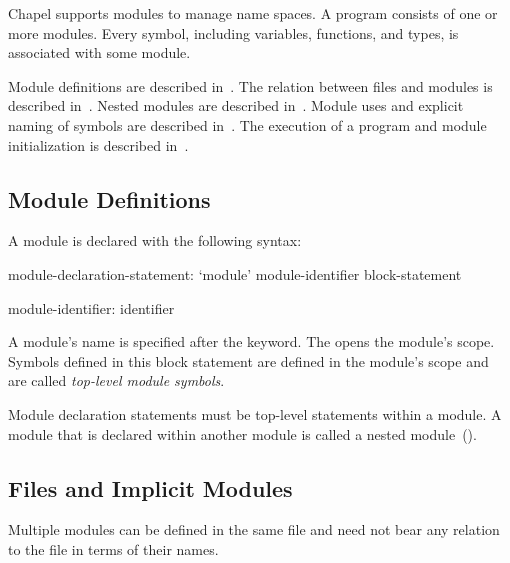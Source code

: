 \label{Modules}


Chapel supports modules to manage name spaces.  A program consists of
one or more modules.  Every symbol, including variables, functions,
and types, is associated with some module.

Module definitions are described in~.  The
relation between files and modules is described
in~.  Nested modules are described
in~.  Module uses and explicit naming of symbols
are described in~.  The execution of a program and
module initialization is described in~.

\subsection{Module Definitions}
\label{Module_Definitions}


A module is declared with the following syntax:
\begin{syntax}
module-declaration-statement:
  `module' module-identifier block-statement

module-identifier:
  identifier
\end{syntax}

A module's name is specified after the  keyword.
The  opens the module's scope.  Symbols defined
in this block statement are defined in the module's scope and are
called \emph{top-level module symbols}.

Module declaration statements must be top-level statements within a
module.  A module that is declared within another module is called a
nested module~().

\subsection{Files and Implicit Modules}
\label{Implicit_Modules}

Multiple modules can be defined in the same file and need not bear any
relation to the file in terms of their names.

